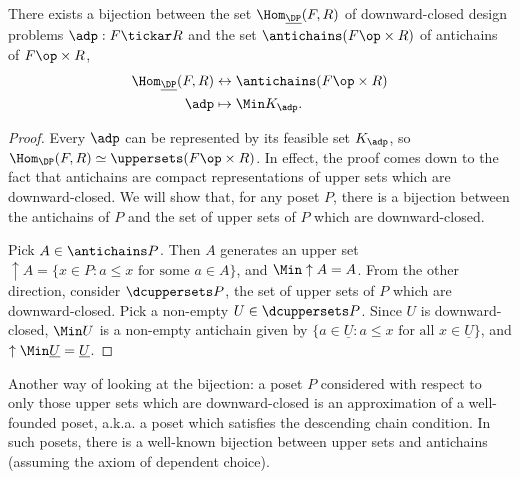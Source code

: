 \begin{lemma}
There exists a bijection between the set $\Hom_{\underline{\DP}}(F,R)$ of downward-closed design problems $\adp : F \tickar R$ and the set $\antichains (F\op \times R)$ of antichains of $F\op \times R$, %
\begin{equation}
\begin{aligned}
\Hom_{\underline{\DP}}(F,R) &\leftrightarrow \antichains (F\op \times R) \\
\adp &\mapsto \Min K_\adp.
\end{aligned}
\end{equation}
\end{lemma}
\begin{proof}
Every $\adp$ can be represented by its feasible set $K_\adp$, so $\Hom_\DP(F,R) \simeq \uppersets (F\op \times R)$. In effect, the proof comes down to the fact that antichains are compact representations of upper sets which are downward-closed. We will show that, for any poset $P$, there is a bijection between the antichains of $P$ and the set of upper sets of $P$ which are downward-closed.

Pick $A \in \antichains P$. Then $A$ generates an upper set $\uparrow A = \{ x \in P : a \leq x \text{ for some $a \in A$} \}$, and $\Min \uparrow A = A$. From the other direction, consider $\dcuppersets  P$, the set of upper sets of $P$ which are downward-closed. Pick a non-empty $U \in \dcuppersets  P$. Since $U$ is downward-closed, $\Min U$ is a non-empty antichain given by $\{ a \in \underline{U} : a \leq x \text{ for all $x \in \underline{U}$} \}$, and $\uparrow \Min \underline{U} = \underline{U}$.
\end{proof}

\begin{remark}Another way of looking at the bijection: a poset $P$ considered with respect to only those upper sets which are downward-closed is an approximation of a well-founded poset, a.k.a. a poset which satisfies the descending chain condition. In such posets, there is a well-known bijection between upper sets and antichains (assuming the axiom of dependent choice).\end{remark}

 

